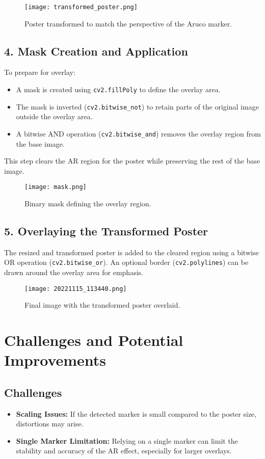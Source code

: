 \documentclass{article}
\begin{document}
\begin{figure}[h]
    \centering
    \texttt{[image: transformed\_poster.png]}
    \caption{Poster transformed to match the perspective of the Aruco marker.}
\end{figure}

\subsection*{4. Mask Creation and Application}
To prepare for overlay:
\begin{itemize}
    \item A mask is created using \texttt{cv2.fillPoly} to define the overlay area.
    \item The mask is inverted (\texttt{cv2.bitwise\_not}) to retain parts of the original image outside the overlay area.
    \item A bitwise AND operation (\texttt{cv2.bitwise\_and}) removes the overlay region from the base image.
\end{itemize}
This step clears the AR region for the poster while preserving the rest of the base image.

\begin{figure}[h]
    \centering
    \texttt{[image: mask.png]}
    \caption{Binary mask defining the overlay region.}
\end{figure}

\subsection*{5. Overlaying the Transformed Poster}
The resized and transformed poster is added to the cleared region using a bitwise OR operation (\texttt{cv2.bitwise\_or}). An optional border (\texttt{cv2.polylines}) can be drawn around the overlay area for emphasis.

\begin{figure}[h]
    \centering
    \texttt{[image: 20221115\_113440.png]}
    \caption{Final image with the transformed poster overlaid.}
\end{figure}

\section*{Challenges and Potential Improvements}
\subsection*{Challenges}
\begin{itemize}
    \item \textbf{Scaling Issues:} If the detected marker is small compared to the poster size, distortions may arise.
    \item \textbf{Single Marker Limitation:} Relying on a single marker can limit the stability and accuracy of the AR effect, especially for larger overlays.
\end{itemize}
\end{document}
